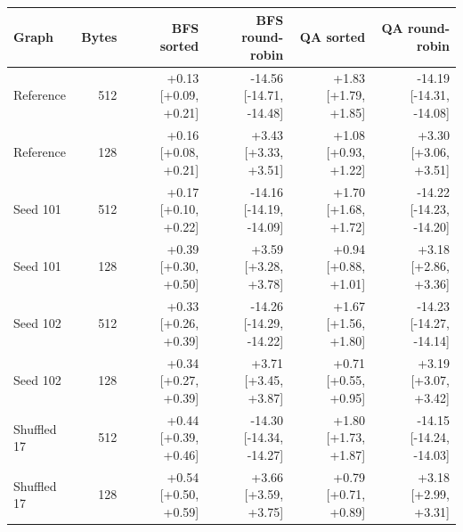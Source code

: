 \begin{tabular}{lrrrrr}
\toprule
Graph & Bytes & BFS sorted & BFS round-robin & QA sorted & QA round-robin \\
\midrule
Reference & 512 & +0.13 [+0.09, +0.21] & -14.56 [-14.71, -14.48] & +1.83 [+1.79, +1.85] & -14.19 [-14.31, -14.08] \\
Reference & 128 & +0.16 [+0.08, +0.21] & +3.43 [+3.33, +3.51] & +1.08 [+0.93, +1.22] & +3.30 [+3.06, +3.51] \\
Seed 101 & 512 & +0.17 [+0.10, +0.22] & -14.16 [-14.19, -14.09] & +1.70 [+1.68, +1.72] & -14.22 [-14.23, -14.20] \\
Seed 101 & 128 & +0.39 [+0.30, +0.50] & +3.59 [+3.28, +3.78] & +0.94 [+0.88, +1.01] & +3.18 [+2.86, +3.36] \\
Seed 102 & 512 & +0.33 [+0.26, +0.39] & -14.26 [-14.29, -14.22] & +1.67 [+1.56, +1.80] & -14.23 [-14.27, -14.14] \\
Seed 102 & 128 & +0.34 [+0.27, +0.39] & +3.71 [+3.45, +3.87] & +0.71 [+0.55, +0.95] & +3.19 [+3.07, +3.42] \\
Shuffled 17 & 512 & +0.44 [+0.39, +0.46] & -14.30 [-14.34, -14.27] & +1.80 [+1.73, +1.87] & -14.15 [-14.24, -14.03] \\
Shuffled 17 & 128 & +0.54 [+0.50, +0.59] & +3.66 [+3.59, +3.75] & +0.79 [+0.71, +0.89] & +3.18 [+2.99, +3.31] \\
\bottomrule
\end{tabular}
